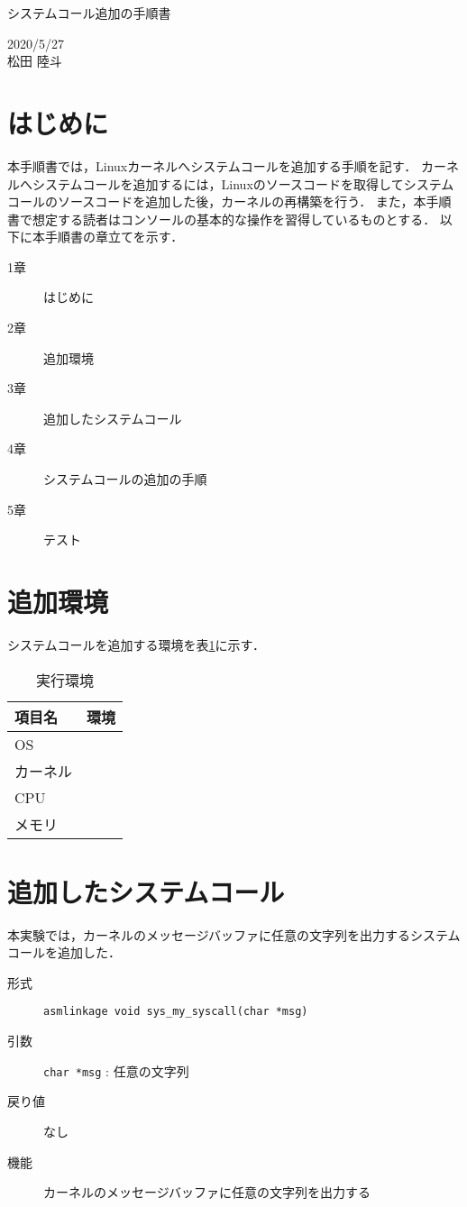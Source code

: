 \documentclass[12pt]{jsarticle}
\begin{document}
\begin{center}
{\LARGE システムコール追加の手順書}
\end{center}

\begin{flushright}
  2020/5/27\\
  松田 陸斗
\end{flushright}
\section{はじめに}
\label{sec:introduction}
本手順書では，Linuxカーネルへシステムコールを追加する手順を記す．
カーネルへシステムコールを追加するには，Linuxのソースコードを取得してシステムコールのソースコードを追加した後，カーネルの再構築を行う．
また，本手順書で想定する読者はコンソールの基本的な操作を習得しているものとする．
以下に本手順書の章立てを示す．
\begin{description}
\item[1章] はじめに
\item[2章] 追加環境
\item[3章] 追加したシステムコール
\item[4章] システムコールの追加の手順
\item[5章] テスト
\end{description}

\section{追加環境}
システムコールを追加する環境を表\ref{env}に示す．

\begin{table}[h]
\begin{center}
	\caption{実行環境}\label{env}
	\begin{tabular}{l|l}
	\hline\hline
	\multicolumn{1}{l|}{項目名} & \multicolumn{1}{l}{環境}\\
	\hline
	OS & \\
	カーネル & \\
	CPU & \\
	メモリ & \\
	\hline
	\end{tabular}
\end{center}
\end{table}
\section{追加したシステムコール}
本実験では，カーネルのメッセージバッファに任意の文字列を出力するシステムコールを追加した．
\begin{description}
	\item[形式] \verb|asmlinkage void sys_my_syscall(char *msg)|
	\item[引数] \verb|char *msg| : 任意の文字列
	\item[戻り値] なし
	\item[機能] カーネルのメッセージバッファに任意の文字列を出力する
\end{description}
\end{document}

